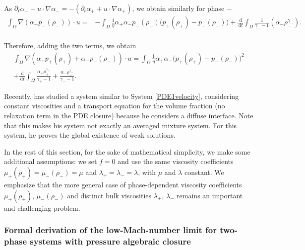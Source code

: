 \documentclass[11pt, twoside, a4paper]{article}
\theoremstyle{plain}
\theoremstyle{remark}
\numberwithin{equation}{section}
\newcommand{\dd}{\,\mathrm{d}}
\newcommand{\ap}{\alpha_+}
\newcommand{\am}{\alpha_-}
\newcommand{\rp}{\rho_+}
\newcommand{\rmi}{\rho_-}
\newcommand{\gp}{\gamma_{+}}
\newcommand{\gm}{\gamma_-}
\begin{document}
As $\partial_t \am + u\cdot \nabla \am = -(\partial_t \ap + u\cdot \nabla \ap)$, we obtain similarly for phase $-$
\begin{align*}
    \int_\Omega \nabla (\am p_-(\rmi)) \cdot u =& - \int_\Omega \frac{1}{\eta} \ap \am p_-(\rmi) \Big(p_+(\rp)-p_-(\rmi)\Big) + \frac{\dd}{\dd t} \int_\Omega \frac{1}{\gm-1} (\am \rmi^{\gm}).\\
\end{align*}

Therefore, adding the two terms, we obtain
\begin{multline*}
    \int_\Omega \nabla(\ap p_+(\rp) + \am p_-(\rmi)) \cdot u = \int_\Omega \frac{1}{\eta} \ap \am \Big(p_+(\rp) - p_-(\rmi) \Big)^2 \\
    + \frac{\dd}{\dd t} \int_\Omega  \frac{\ap \rp^{\gp}}{\gp-1}+\frac{\am \rmi^{\gm}}{\gm-1}.
\end{multline*}

Recently, \cite{novotny2020weak1} has studied a system similar to System \eqref{PDE1velocity}, considering constant viscosities and a transport equation for the volume fraction (no relaxation term in the PDE closure) because he considers a diffuse interface. Note that this makes his system not exactly an averaged mixture system. For this system, he proves the global existence of weak solutions.

In the rest of this section, for the sake of mathematical simplicity, we make some additional assumptions: we set $f=0$ and use the same viscosity coefficients $\mu_+(\rp)=\mu_-(\rmi)=\mu$ and $ \lambda_+=\lambda_-=\lambda$, with $\mu$ and $\lambda$ constant. We emphasize that the more general case of phase-dependent viscosity coefficients $\mu_+(\rho_+)$, $\mu_-(\rho_-)$ and distinct bulk viscosities $\lambda_+$, $\lambda_-$ remains an important and challenging problem.


\subsubsection{Formal derivation of the low-Mach-number limit for two-phase systems with pressure algebraic closure}\label{formalp}
\end{document}
